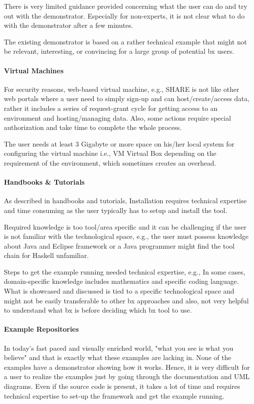 There is very limited guidance provided concerning what the user can do and try out with the demonstrator. Especially for non-experts, it is not clear what to do with the demonstrator after a few minutes.

The existing demonstrator is based on a rather technical example that might not be relevant, interesting, or convincing for a large group of potential bx users.

\paragraph{Virtual Machines}
For security reasons, web-based virtual machine, e.g., SHARE is not like other web portals where a user need to simply sign-up and can host/create/access data, rather it includes a series of request-grant cycle for getting access to an environment and hosting/managing data. Also, some actions require special authorization and take time to complete the whole process.

The user needs at least 3 Gigabyte or more space on his/her local system for configuring the virtual machine i.e., VM Virtual Box depending on the requirement of the environment, which sometimes creates an overhead.

\paragraph{Handbooks \& Tutorials}
As described in handbooks and tutorials, Installation requires technical expertise and time consuming as the user typically has to setup and install the tool.

Required knowledge is too tool/area specific and it can be challenging if the user is not familiar with the technological space, e.g., the user must possess knowledge about Java and Eclipse framework or a Java programmer might find the tool chain for Haskell unfamiliar.

Steps to get the example running needed technical expertise, e.g., In some cases, domain-specific knowledge includes mathematics and specific coding language. What is showcased and discussed is tied to a specific technological space and might not be easily transferable to other bx approaches and also, not very helpful to understand what bx is before deciding which bx tool to use.

\paragraph{Example Repositories}
In today's fast paced and visually enriched world, "what you see is what you believe" and that
is exactly what these examples are lacking in. None of the examples have a demonstrator
showing how it works. Hence, it is very difficult for a user to realize the examples just by going
through the documentation and UML diagrams. Even if the source code is present, it takes a lot
of time and requires technical expertise to set-up the framework and get the example running.

